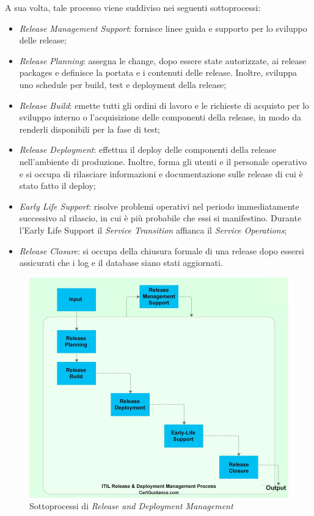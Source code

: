 	A sua volta, tale processo viene suddiviso nei seguenti sottoprocessi:
	
	\begin{itemize}[noitemsep]
		\item \textit{Release Management Support}: fornisce linee guida e supporto per lo sviluppo delle release;
		\item \textit{Release Planning}: assegna le change, dopo essere state autorizzate, ai release packages e definisce la portata e i contenuti delle release. Inoltre, sviluppa uno schedule per build, test e deployment della release;
		\item \textit{Release Build}: emette tutti gli ordini di lavoro e le richieste di acquisto per lo sviluppo interno o l'acquisizione delle componenti della release, in modo da renderli disponibili per la fase di test;
		\item \textit{Release Deployment}: effettua il deploy delle componenti della release nell'ambiente di produzione. Inoltre, forma gli utenti e il personale operativo e si occupa di rilasciare informazioni e documentazione sulle release di cui è stato fatto il deploy;
		\item \textit{Early Life Support}: risolve problemi operativi nel periodo immediatamente successivo al rilascio, in cui è più probabile che essi si manifestino. Durante l’Early Life Support il \textit{Service Transition} affianca il \textit{Service Operations};
		\item \textit{Release Closure}: si occupa della chiusura formale di una release dopo essersi assicurati che i log e il database siano stati aggiornati.
	\end{itemize}

	\begin{figure}[h!]
		\centering
		\includegraphics[width=\linewidth]{img/intro_rollout.png}
		\caption{Sottoprocessi di \textit{Release and Deployment Management}\cite{release_deployment_management}}
		\label{fig:intro_rollout}
	\end{figure}

